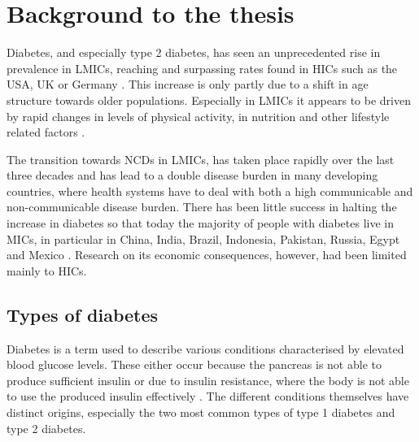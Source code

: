 
\section{Background to the thesis}

Diabetes, and especially type 2 diabetes, has seen an unprecedented rise in prevalence in \acp{LMIC}, reaching and surpassing rates found in \acp{HIC} such as the USA, UK or Germany \parencite{Risk2016,Hu2011}. This increase is only partly due to a shift in age structure towards older populations. Especially in \acp{LMIC} it appears to be driven by rapid changes in levels of physical activity, in nutrition and other lifestyle related factors  \parencite{Risk2016,Hu2011}.

The transition towards \acp{NCD} in \acp{LMIC}, has taken place rapidly over the last three decades and has lead to a double disease burden in many developing countries, where health systems have to deal with both a high communicable and non-communicable disease burden. There has been little success in halting the increase in diabetes so that today the majority of people with diabetes live in \acp{MIC}, in particular in China, India, Brazil, Indonesia, Pakistan, Russia, Egypt and Mexico \parencite{Risk2016}. Research on its economic consequences, however, had been limited mainly to \acp{HIC}.

 
\subsection{Types of diabetes}

Diabetes is a term used to describe various conditions characterised by elevated blood glucose levels. These either occur because the pancreas is not able to produce sufficient insulin or due to insulin resistance, where the body is not able to use the produced insulin effectively \parencite{WorldHealthOrganization2016}. The different conditions themselves have distinct origins, especially the two most common types of type 1 diabetes and type 2 diabetes. 

